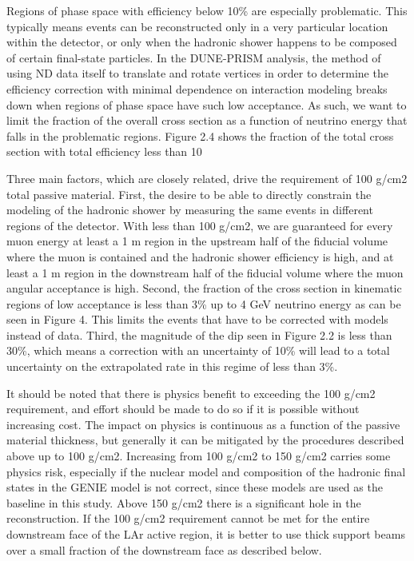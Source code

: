 Regions of phase space with efficiency below 10\% are especially problematic. This typically means events can be reconstructed only in a very particular location within the detector, or only when the hadronic shower happens to be composed of certain final-state particles. In the DUNE-PRISM analysis, the method of using ND data itself to translate and rotate vertices in order to determine the efficiency correction with minimal dependence on interaction modeling breaks down when regions of phase space have such low acceptance. As such, we want to limit the fraction of the overall cross section as a function of neutrino energy that falls in the problematic regions. Figure 2.4 shows the fraction of the total cross section with total efficiency less than 10%

Three main factors, which are closely related, drive the requirement of 100 g/cm2 total passive material. First, the desire to be able to directly constrain the modeling of the hadronic shower by measuring the same events in different regions of the detector. With less than 100 g/cm2, we are guaranteed for every muon energy at least a 1 m region in the upstream half of the fiducial volume where the muon is contained and the hadronic shower efficiency is high, and at least a 1 m region in the downstream half of the fiducial volume where the muon angular acceptance is high. Second, the fraction of the cross section in kinematic regions of low acceptance is less than 3\% up to 4 GeV neutrino energy as can be seen in Figure 4. This limits the events that have to be corrected with models instead of data. Third, the magnitude of the dip seen in Figure 2.2 is less than 30\%, which means a correction with an uncertainty of 10\% will lead to a total uncertainty on the extrapolated rate in this regime of less than 3\%.

It should be noted that there is physics benefit to exceeding the 100 g/cm2 requirement, and effort should be made to do so if it is possible without increasing cost. The impact on physics is continuous as a function of the passive material thickness, but generally it can be mitigated by the procedures described above up to 100 g/cm2. Increasing from 100 g/cm2 to 150 g/cm2 carries some physics risk, especially if the nuclear model and composition of the hadronic final states in the GENIE model is not correct, since these models are used as the baseline in this study. Above 150 g/cm2 there is a significant hole in the reconstruction. If the 100 g/cm2 requirement cannot be met for the entire downstream face of the LAr active region, it is better to use thick support beams over a small fraction of the downstream face as described below.

